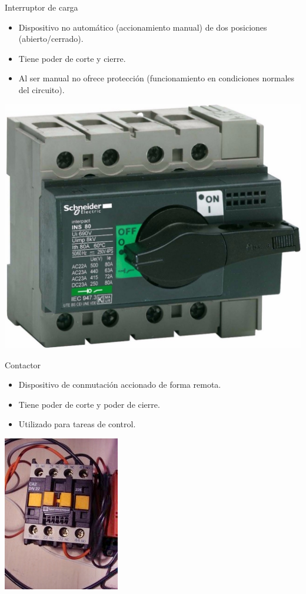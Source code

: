 \documentclass[xcolor={usenames,svgnames,dvipsnames}]{beamer}
\begin{document}
\begin{frame}[label={sec:org1306b3a}]{Interruptor de carga}
\begin{itemize}
\item Dispositivo no automático (\alert{accionamiento manual}) de dos posiciones (abierto/cerrado).

\item Tiene \alert{poder de corte y cierre}.

\item Al ser manual \alert{no ofrece protección} (funcionamiento en condiciones normales del circuito).
\end{itemize}
\begin{center}
\includegraphics[height=0.6\textheight]{figs/interruptor_manual.jpg}
\end{center}
\end{frame}


\begin{frame}[label={sec:orgcba5d28}]{Contactor}
\begin{itemize}
\item Dispositivo de conmutación accionado de forma remota.
\item Tiene poder de corte y poder de cierre.
\item Utilizado para tareas de control.
\end{itemize}

\begin{center}
\includegraphics[height=0.6\textheight]{figs/Contactor.jpg}
\end{center}
\end{frame}
\end{document}
